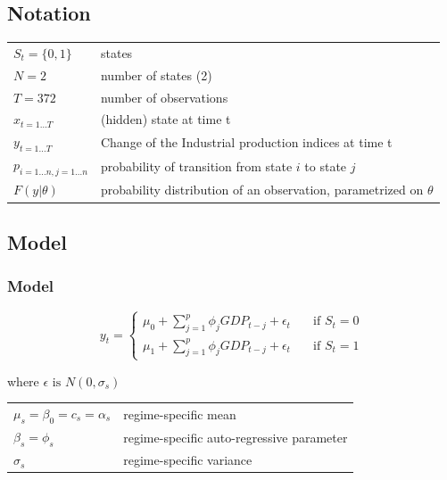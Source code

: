 \documentclass[12pt,a4paper,oneside]{book}
\begin{document}
\subsection{Notation}

\begin{tabular}{l l}
    $S_t = \{0, 1\}$&   states        \\
    $N = 2$         &   number of states (2) \\
    $T = 372 $            & 	number of observations  \\
    $x_{t=1\dots T}$ & (hidden) state at time t \\
    $y_{t=1\dots T}$ 	& Change of the Industrial production indices at time t \\
    $p_{i=1\dots n,j=1\dots n}$ & probability of transition from state $i$ to state $j$ \\
    $F(y|\theta )$	&  probability distribution of an observation, parametrized on $\theta$ \\
\end{tabular}



\subsection{Model}

\subsubsection{Model}




\begin{equation}
y_{t} =   
  \begin{cases}
    \mu_{0} + \sum^p_{j = 1} \phi_j GDP_{t-j} + \epsilon_t      & \quad \text{if } S_t = 0 \\
    \mu_{1} + \sum^p_{j = 1} \phi_j GDP_{t-j} + \epsilon_t      & \quad \text{if } S_t = 1
  \end{cases}
\end{equation}

where $\epsilon \text{ is } N(0,\sigma_s)$


\begin{tabular}{l l}
    $\mu_{s} = \beta_0 = c_s = \alpha_s $    & regime-specific mean    \\
    $\beta_{s} = \phi_s$ & regime-specific  auto-regressive parameter \\
    $\sigma_{s}$ & regime-specific variance    \\

\end{tabular}
\end{document}
